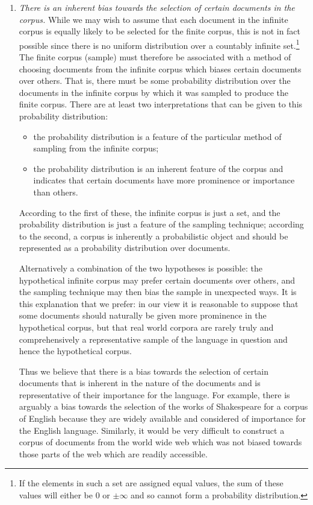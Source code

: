 \documentclass[12pt]{report}
\begin{document}
\begin{enumerate}
\item \emph{There is an inherent bias towards the selection of certain documents in the corpus.} While we may wish to assume that each document in the infinite corpus is equally likely to be selected for the finite corpus, this is not in fact possible since there is no uniform distribution over a countably infinite set.\footnote{If the elements in such a set are assigned equal values, the sum of these values will either be 0 or $\pm\infty$ and so cannot form a probability distribution.} The finite corpus (sample) must therefore be associated with a method of choosing documents from the infinite corpus which biases certain documents over others. That is, there must be some probability distribution over the documents in the infinite corpus by which it was sampled to produce the finite corpus. There are at least two interpretations that can be given to this probability distribution:
\begin{itemize}
\item the probability distribution is a feature of the particular method of sampling from the infinite corpus;
\item the probability distribution is an inherent feature of the corpus and indicates that certain documents have more prominence or importance than others.
\end{itemize}
According to the first of these, the infinite  corpus is just a set, and the probability distribution is just a feature of the sampling technique; according to the second, a corpus is inherently a probabilistic object and should be represented as a probability distribution over documents.

Alternatively a combination of the two hypotheses is possible: the hypothetical infinite corpus may prefer certain documents over others, and the sampling technique may then bias the sample in unexpected ways. It is this explanation that we prefer: in our view it is reasonable to suppose that some documents should naturally be given more prominence in the hypothetical corpus, but that real world corpora are rarely truly and comprehensively a representative sample of the language in question and hence the hypothetical corpus. 

Thus we believe that there is a bias towards the selection of certain documents that is inherent in the nature of the documents and is representative of their importance for the language. For example, there is arguably a bias towards the selection of the works of Shakespeare for a corpus of English because they are widely available and considered of importance for the English language. Similarly, it would be very difficult to construct a corpus of documents from the world wide web which was not biased towards those parts of the web which are readily accessible. 


\end{enumerate}
\end{document}
